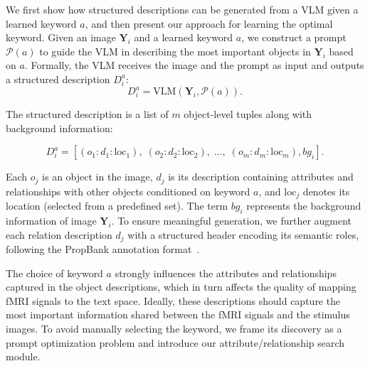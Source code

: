 
We first show how structured descriptions can be generated from a VLM given a learned keyword $a$, and then present our approach for learning the optimal keyword. Given an image $\mathbf{Y}_i$ and a learned keyword $a$, we construct a prompt $\mathcal{P}(a)$ to guide the VLM in describing the most important objects in $\mathbf{Y}_i$ based on $a$. Formally, the VLM receives the image and the prompt as input and outputs a structured description $D_i^a$:
\begin{equation}
    D_i^a = \text{VLM}(\mathbf{Y}_i, \mathcal{P}(a)).
\end{equation}

\vspace{-0.3cm}
The structured description is a list of $m$ object-level tuples along with background information:

\vspace{-0.3cm}
\begin{equation}
D_i^a = \left[ (o_1: d_1: \text{loc}_1), \; (o_2: d_2 : \text{loc}_2), \; \dots, \;( o_m: d_m: \text{loc}_m), bg_i \right].
\label{eq:structure_des}
\end{equation}

Each $o_j$ is an object in the image, $d_j$ is its description containing attributes and relationships with other objects conditioned on keyword $a$, and $\text{loc}_j$ denotes its location (selected from a predefined set). The term $bg_i$ represents the background information of image $\mathbf{Y}_i$. 
To ensure meaningful generation, we further augment each relation description $ d_j$ with a structured header encoding its semantic roles, following the PropBank annotation format~\citep{marquez2008semantic, he2017deep, ross2021tailor, palmer2005proposition}.

The choice of keyword $a$ strongly influences the attributes and relationships captured in the object descriptions, which in turn affects the quality of mapping fMRI signals to the text space. Ideally, these descriptions should capture the most important information shared between the fMRI signals and the stimulus images. To avoid manually selecting the keyword, we frame its discovery as a prompt optimization problem and introduce our attribute/relationship search module.



